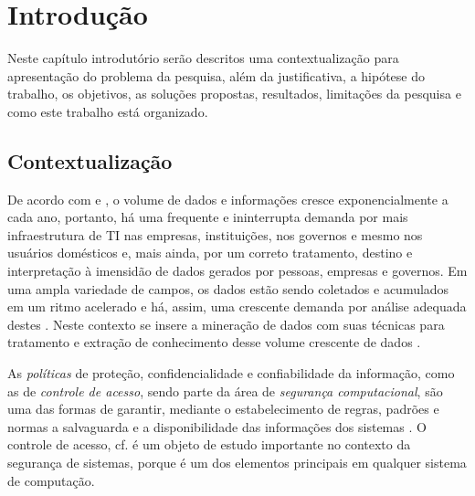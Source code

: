 \documentclass[
	12pt,				%
	openright,			%
	oneside,			%
	a4paper,			%
	english,			%
	french,				%
	spanish,			%
	brazil				%
	]{abntex2}
\begin{document}

\tableofcontents*
\cleardoublepage


\textual

\chapter{Introdução} \label{introducao}
Neste capítulo introdutório serão descritos uma contextualização para apresentação do problema da pesquisa, além da justificativa, a hipótese do trabalho, os objetivos, as soluções propostas, resultados, limitações da pesquisa e como este trabalho está organizado.
\section{Contextualização} \label{contextualizacao}
De acordo com  e  , o volume de dados e informações cresce exponencialmente a cada ano, portanto, há uma frequente e ininterrupta demanda por mais infraestrutura de TI nas empresas, instituições, nos governos e mesmo nos usuários domésticos e, mais ainda, por um correto tratamento, destino e interpretação à imensidão de dados gerados por pessoas, empresas e governos. Em uma ampla variedade de campos, os dados estão sendo coletados e acumulados em um ritmo acelerado e há, assim, uma crescente demanda por análise adequada destes \cite{fayyad1996, lima_fraud_2012}. Neste contexto se insere a mineração de dados com suas técnicas para tratamento e extração de conhecimento desse volume crescente de dados \cite{Boscarioli2017, ferrari2017}.

As \textit{políticas} de proteção, confidencialidade e confiabilidade da informação, como as de \textit{controle de acesso}, sendo parte da área de \textit{segurança computacional}, são uma das formas de garantir, mediante o estabelecimento de regras, padrões e normas a salvaguarda e a disponibilidade das informações dos sistemas \cite{bui_efficient_2019}. O controle de acesso, cf.  é um objeto de estudo importante no contexto da segurança de sistemas, porque é um dos elementos principais em qualquer sistema de computação.
\end{document}

